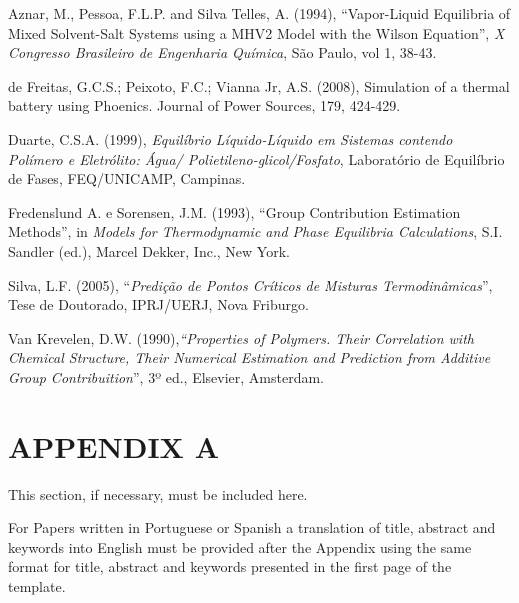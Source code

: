 \documentclass[12pt,fleqn]{article}
\begin{document}
\begin{thebibliography}{99}
\fontsize{11}{0}\selectfont
{}
Aznar, M., Pessoa, F.L.P. and Silva Telles, A. (1994), ``Vapor-Liquid Equilibria of Mixed Solvent-Salt Systems using a MHV2 Model with the Wilson Equation'', {\em X Congresso Brasileiro de Engenharia Química}, São Paulo, vol 1, 38-43.

de Freitas, G.C.S.; Peixoto, F.C.; Vianna Jr, A.S. (2008), Simulation of a thermal battery using Phoenics. Journal of Power Sources, 179, 424-429. 

Duarte, C.S.A. (1999), {\em Equilíbrio Líquido-Líquido em Sistemas contendo Polímero e Eletrólito: Água/ Polietileno-glicol/Fosfato}, Laboratório de Equilíbrio de Fases, FEQ/UNICAMP, Campinas.

Fredenslund A. e Sorensen, J.M. (1993), ``Group Contribution Estimation Methods'', in {\em  Models for Thermodynamic and Phase Equilibria Calculations}, S.I. Sandler (ed.), Marcel Dekker, Inc., New York.

Silva, L.F. (2005), ``{\em Predição de Pontos Críticos de Misturas Termodinâmicas}'', Tese de Doutorado, IPRJ/UERJ, Nova Friburgo.

Van Krevelen, D.W. (1990),{\em ``Properties of Polymers. Their Correlation with Chemical Structure, Their Numerical Estimation and Prediction from Additive Group Contribuition}'', 3º ed., Elsevier, Amsterdam.
\end{thebibliography}
\vspace*{-0.1cm}
\section*{APPENDIX A}
This section, if necessary, must be included here.

\vspace{0.5cm} %

For Papers written in Portuguese or Spanish a translation of title, abstract and keywords into English must be provided after the Appendix using the same format for title, abstract and keywords presented in the first page of the template.





\end{document}
